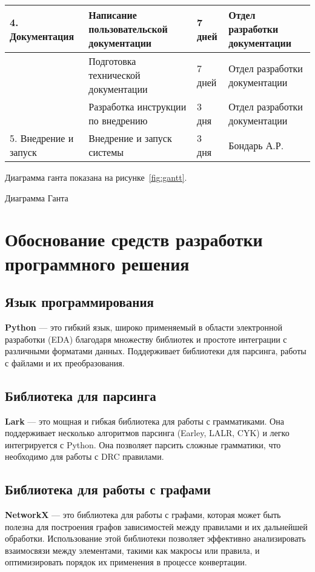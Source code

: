 \begin{longtable}{|p{4.5cm}|p{4cm}|p{3cm}|p{4cm}|}
	4. Документация
	& Написание пользовательской документации
	& 7 дней
	& Отдел разработки документации \\ \hline

	& Подготовка технической документации
	& 7 дней
	& Отдел разработки документации \\ \hline

	& Разработка инструкции по внедрению
	& 3 дня
	& Отдел разработки документации \\ \hline

	5. Внедрение и запуск
	& Внедрение и запуск системы
	& 3 дня
	& Бондарь А.Р. \\ \hline
\end{longtable}

Диаграмма ганта показана на рисунке~\ref{fig:gantt}.

\begin{image}
	\caption{Диаграмма Ганта}
	\label{fig:gantt}
\end{image}

\section{Обоснование средств разработки программного решения}

\subsection{Язык программирования}
\textbf{Python} --- это гибкий язык,
широко применяемый в области электронной разработки (EDA)
благодаря множеству библиотек
и простоте интеграции с различными форматами данных.
Поддерживает библиотеки для парсинга, работы с файлами и их преобразования.
  
\subsection{Библиотека для парсинга}
\textbf{Lark} --- это мощная и гибкая библиотека
для работы с грамматиками.
Она поддерживает несколько алгоритмов парсинга (Earley, LALR, CYK)
и легко интегрируется с Python.
Она позволяет парсить сложные грамматики,
что необходимо для работы с DRC правилами.

\subsection{Библиотека для работы с графами}
\textbf{NetworkX} --- это библиотека для работы с графами,
которая может быть полезна для построения графов зависимостей между правилами
и их дальнейшей обработки.
Использование этой библиотеки позволяет эффективно анализировать взаимосвязи
между элементами, такими как макросы или правила,
и оптимизировать порядок их применения в процессе конвертации.

